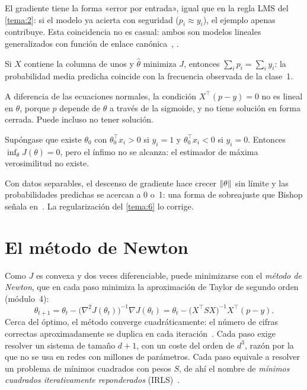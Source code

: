 El gradiente tiene la forma «error por entrada», igual que en la regla LMS del \cref{tema:2}: si el modelo ya acierta con seguridad ($p_i\approx y_i$), el ejemplo apenas contribuye. Esta coincidencia no es casual: ambos son modelos lineales generalizados con función de enlace canónica~\cite[cap.~3]{cs229}, \cite[§4.3.6]{bishop}.

\begin{corolario}\label{cor:calibracion}
Si $X$ contiene la columna de unos y $\hat\theta$ minimiza $J$, entonces $\sum_i p_i=\sum_i y_i$: la probabilidad media predicha coincide con la frecuencia observada de la clase~1.
\end{corolario}

A diferencia de las ecuaciones normales, la condición $X^{\top}(p-y)=0$ no es lineal en $\theta$, porque $p$ depende de $\theta$ a través de la sigmoide, y no tiene solución en forma cerrada. Puede incluso no tener solución.

\begin{proposicion}\label{prop:separable}
Supóngase que existe $\theta_0$ con $\theta_0^{\top}x_i>0$ si $y_i=1$ y $\theta_0^{\top}x_i<0$ si $y_i=0$. Entonces $\inf_\theta J(\theta)=0$, pero el ínfimo no se alcanza: el estimador de máxima verosimilitud no existe.
\end{proposicion}

Con datos separables, el descenso de gradiente hace crecer $\lVert\theta\rVert$ sin límite y las probabilidades predichas se acercan a 0 o~1: una forma de sobreajuste que Bishop señala en~\cite[§4.3.2]{bishop}. La regularización del \cref{tema:6} lo corrige.

\section{El método de Newton}

Como $J$ es convexa y dos veces diferenciable, puede minimizarse con el \emph{método de Newton}, que en cada paso minimiza la aproximación de Taylor de segundo orden (módulo~4):
\[
\theta_{t+1}=\theta_t-\bigl(\nabla^{2}J(\theta_t)\bigr)^{-1}\nabla J(\theta_t)=\theta_t-\bigl(X^{\top}SX\bigr)^{-1}X^{\top}(p-y).
\]
Cerca del óptimo, el método converge cuadráticamente: el número de cifras correctas aproximadamente se duplica en cada iteración~\cite[§2.4]{cs229}. Cada paso exige resolver un sistema de tamaño $d+1$, con un coste del orden de $d^{3}$, razón por la que no se usa en redes con millones de parámetros. Cada paso equivale a resolver un problema de mínimos cuadrados con pesos $S$, de ahí el nombre de \emph{mínimos cuadrados iterativamente reponderados} (IRLS)~\cite[§4.3.3]{bishop}.

